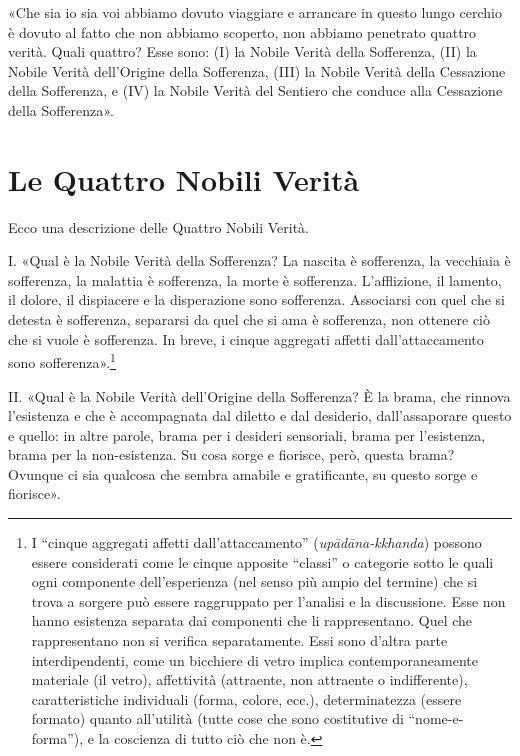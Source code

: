 
«Che sia io sia voi abbiamo dovuto viaggiare e arrancare in questo lungo cerchio
è dovuto al fatto che non abbiamo scoperto, non abbiamo penetrato quattro
verità. Quali quattro? Esse sono: (I) la Nobile Verità della Sofferenza, (II) la
Nobile Verità dell’Origine della Sofferenza, (III) la Nobile Verità della
Cessazione della Sofferenza, e (IV) la Nobile Verità del Sentiero che conduce
alla Cessazione della Sofferenza».


\section*{Le Quattro Nobili Verità}

 Ecco una descrizione delle Quattro Nobili Verità.

 I. «Qual è la Nobile Verità della Sofferenza? La nascita è
sofferenza, la vecchiaia è sofferenza, la malattia è sofferenza, la morte è
sofferenza. L’afflizione, il lamento, il dolore, il dispiacere e la disperazione
sono sofferenza. Associarsi con quel che si detesta è sofferenza, separarsi da
quel che si ama è sofferenza, non ottenere ciò che si vuole è sofferenza. In
breve, i cinque aggregati affetti dall’attaccamento sono sofferenza».\footnote{I
  “cinque aggregati affetti dall’attaccamento” (\emph{upādāna-kkhanda}) possono
  essere considerati come le cinque apposite “classi” o categorie sotto le quali
  ogni componente dell’esperienza (nel senso più ampio del termine) che si trova
  a sorgere può essere raggruppato per l’analisi e la discussione. Esse non
  hanno esistenza separata dai componenti che li rappresentano. Quel che
  rappresentano non si verifica separatamente. Essi sono d’altra parte
  interdipendenti, come un bicchiere di vetro implica contemporaneamente
  materiale (il vetro), affettività (attraente, non attraente o indifferente),
  caratteristiche individuali (forma, colore, ecc.), determinatezza (essere
  formato) quanto all’utilità (tutte cose che sono costitutive di
  “nome-e-forma”), e la coscienza di tutto ciò che non è.}


II. «Qual è la Nobile Verità dell’Origine della Sofferenza? È la brama, che
rinnova l’esistenza e che è accompagnata dal diletto e dal desiderio,
dall’assaporare questo e quello: in altre parole, brama per i desideri
sensoriali, brama per l’esistenza, brama per la non-esistenza. Su cosa sorge e
fiorisce, però, questa brama? Ovunque ci sia qualcosa che sembra amabile e
gratificante, su questo sorge e fiorisce».

